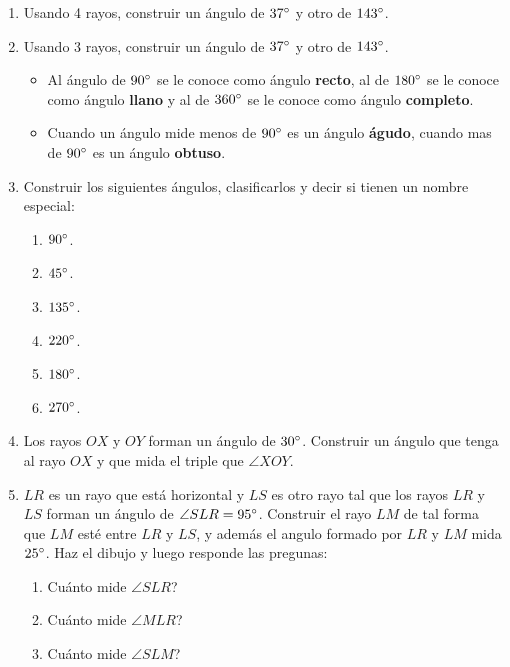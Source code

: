 \begin{enumerate}
	\item Usando 4 rayos, construir un ángulo de $37\degree$ y otro de $143\degree $.\vspace{5cm}
	
	\item Usando 3 rayos, construir un ángulo de $37\degree$ y otro de $143\degree $.\vspace{5cm}
	\begin{itemize}
		\item Al ángulo de $90\degree$ se le conoce como ángulo \textbf{recto}, al de $180\degree$ se le conoce como ángulo \textbf{llano} y al de $360\degree$ se le conoce como ángulo \textbf{completo}.
		\item Cuando un ángulo mide menos de $90\degree $ es un ángulo \textbf{águdo}, cuando mas de $90\degree $ es un ángulo \textbf{obtuso}.
	\end{itemize}
	\item Construir los siguientes ángulos, clasificarlos y decir si tienen un nombre especial: 
	\begin{enumerate}[label=\Alph*)]
		\item $90\degree $. \vspace{4cm}
		\item $45\degree $. \vspace{4cm}
		\item $135\degree $. \vspace{4cm}
		\item $220\degree $. \vspace{4cm} 
		\item $180\degree $. \vspace{4cm}
		\item $270\degree $. \vspace{4cm}																			
	\end{enumerate}
	
	\item Los rayos $OX$ y $OY$ forman un ángulo de $30\degree$. Construir un ángulo que tenga al rayo $OX$ y que mida el triple que $\angle XOY$. \vspace{5cm}	
	
	\item $LR$ es un rayo que está horizontal y $LS$ es otro rayo tal que los rayos $LR$ y $LS$ forman un ángulo de $ \angle SLR=95 \degree$. Construir el rayo $LM$ de tal forma que $LM$ esté entre $LR$ y $LS$, y además el angulo formado por $LR$ y $LM$ mida $25\degree$. Haz el dibujo y luego responde las pregunas: \vspace{5cm}
	\begin{enumerate}[label=\Alph*)]
		\item Cuánto mide $\angle SLR $?					
		\item Cuánto mide $\angle MLR $?
		\item Cuánto mide $\angle SLM $?																								
	\end{enumerate}
	
	
	
\end{enumerate}


